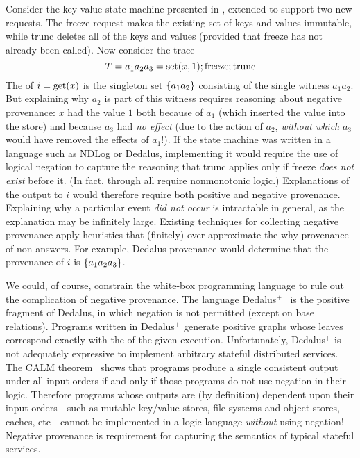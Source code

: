 Consider the key-value state machine presented in ,
extended to support two new requests. The freeze request makes the existing set of keys and
values immutable, while trunc deletes all of the keys and values (provided that
freeze has not already been called). Now consider the trace
\[
  T = a_1 a_2 a_3 = \text{set}(x,1); \text{freeze}; \text{trunc}
\]
The \watprovenance{} of $i = \text{get}(x)$ is the singleton set $\{a_1a_2\}$
consisting of the single witness $a_1a_2$. But explaining why $a_2$ is part of
this witness requires reasoning about negative provenance: $x$ had the value $1$ both
because of $a_1$ (which inserted the value into the store) and because $a_3$
had \emph{no effect} (due to the action of $a_2$, \emph{without which} $a_3$ would have
removed the effects of $a_1$!). If the state machine was written in a language
such as NDLog or Dedalus, implementing it would require the use of logical
negation to capture the reasoning that trunc applies only if freeze \emph{does not exist} before it. 
 (In fact,  through
 all require nonmonotonic logic.) Explanations of the output to $i$ would therefore require both positive and negative
provenance. Explaining why a particular event \emph{did not occur} is
intractable in general, as the explanation may be infinitely large.  Existing
techniques for collecting negative provenance apply heuristics that (finitely)
over-approximate the why provenance of non-answers.  For example, Dedalus
provenance would determine that the provenance of $i$ is $\{a_1a_2a_3\}$.

\newcommand{\dedalusplus}{Dedalus$^+$}
We could, of course, constrain the white-box programming language to rule out the
complication of negative provenance.  The language
\dedalusplus~\cite{marczak2012confluence} is the positive fragment of Dedalus,
in which negation is not permitted (except on base relations). Programs written
in \dedalusplus{} generate positive \whyprovenance{} graphs whose leaves
correspond exactly with the \watprovenance{} of the given execution.
Unfortunately, \dedalusplus{} is not adequately expressive to implement
arbitrary stateful distributed services. The CALM
theorem~\cite{alvaro2011consistency,ameloot2013transducers} shows that 
programs produce a single consistent output under all input orders
if and only if those programs do not use negation in their logic. Therefore
programs whose outputs are (by definition) dependent upon their input
orders---such as mutable key/value stores, file systems and object stores, caches,
etc---cannot be implemented in a logic language \emph{without} using negation! Negative provenance is requirement for capturing the semantics of typical stateful services.


